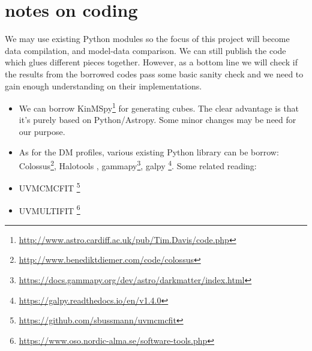 \documentclass[twocolumn,tighten]{aastex62}
\begin{document}
\section{notes on coding}

We may use existing Python modules so the focus of this project will become data compilation, and model-data comparison. We can still publish the code which glues different pieces together.
However, as a bottom line we will check if the results from the borrowed codes pass some basic sanity check and we need to gain enough understanding on their implementations.

\begin{itemize}

\item We can borrow KinMSpy\footnote{\url{http://www.astro.cardiff.ac.uk/pub/Tim.Davis/code.php}} for generating cubes. The clear advantage is that it's purely based on Python/Astropy. Some minor changes may be need for our purpose.

\item As for the DM profiles, various existing Python library can be borrow: Colossus\footnote{\url{http://www.benediktdiemer.com/code/colossus}}, Halotools \citep{Hearin:2017aa}, gammapy\footnote{\url{https://docs.gammapy.org/dev/astro/darkmatter/index.html}},
galpy \footnote{\url{https://galpy.readthedocs.io/en/v1.4.0}}.
Some related reading: \citet{Diemer:2017aa,Robotham:2018aa,Mead:2015aa}

\item UVMCMCFIT \footnote{\url{https://github.com/sbussmann/uvmcmcfit}}

\item UVMULTIFIT  \footnote{\url{https://www.oso.nordic-alma.se/software-tools.php}}


\end{itemize}
\end{document}

